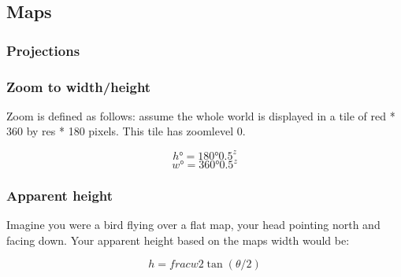 \subsection{Maps}

\subsubsection{Projections}

\subsubsection{Zoom to width/height}
Zoom is defined as follows: assume the whole world is displayed in a tile of red * 360 by res * 180 pixels. This tile has zoomlevel 0.

$$ h° = 180° 0.5^z $$
$$ w° = 360° 0.5^z $$

\subsubsection{Apparent height}
Imagine you were a bird flying over a flat map, your head pointing north and facing down. Your apparent height based on the maps width would be:

$$ h = frac{w}{2 \tan(\theta / 2)} $$
